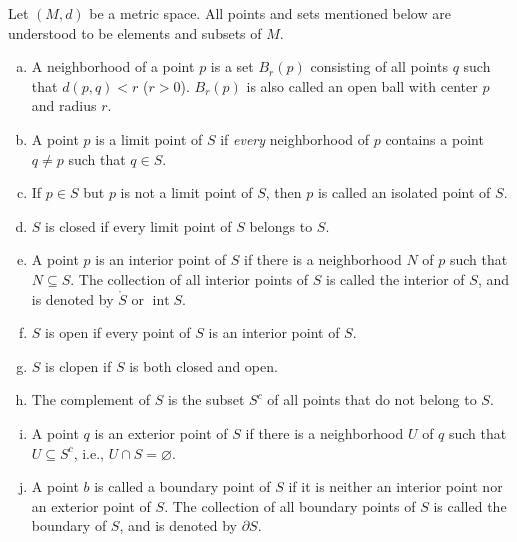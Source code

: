 \begin{defn}
  Let $(M, d)$ be a metric space.
  All points and sets mentioned below are understood to be elements and subsets of $M$.
  \begin{enumerate}[(a)]
    \item A \textsf{neighborhood} of a point $p$ is a set $B_r(p)$ consisting of all points $q$ such that $d(p,q) < r$ ($r > 0$).
      $B_r(p)$ is also called an \textsf{open ball} with center $p$ and radius $r$.

    \item A point $p$ is a \textsf{limit point} of $S$ if \textit{every} neighborhood of $p$ contains a point $q \ne p$ such that $q \in S$.

    \item If $p \in S$ but $p$ is not a limit point of $S$, then $p$ is called an \textsf{isolated point} of $S$.

    \item $S$ is \textsf{closed} if every limit point of $S$ belongs to $S$.

    \item A point $p$ is an \textsf{interior point} of $S$ if there is a neighborhood $N$ of $p$ such that $N \subseteq S$.  The collection of all interior points of $S$ is called the \textsf{interior} of $S$, and is denoted by $\mathring{S}$ or $\operatorname{int} S$.

    \item $S$ is \textsf{open} if every point of $S$ is an interior point of $S$.

    \item $S$ is \textsf{clopen} if $S$ is both closed and open.

    \item The \textsf{complement} of $S$ is the subset $S^c$ of all points that do not belong to $S$.

    \item A point $q$ is an \textsf{exterior point} of $S$ if there is a neighborhood $U$ of $q$ such that $U \subseteq S^c$, i.e., $U \cap S = \varnothing$.

    \item A point $b$ is called a \textsf{boundary point} of $S$ if it is neither an interior point nor an exterior point of $S$.
      The collection of all boundary points of $S$ is called the \textsf{boundary} of $S$, and is denoted by $\partial S$.
  \end{enumerate}
\end{defn}

